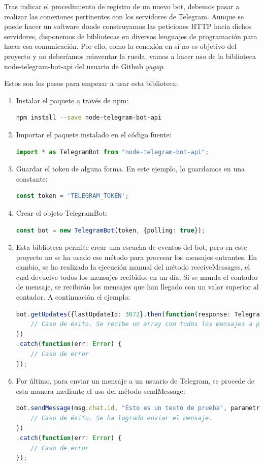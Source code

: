 \documentclass[spanish,12pt, a4paper, twoside]{paper}
\begin{document}
Tras indicar el procedimiento de registro de un nuevo bot, debemos pasar a realizar las conexiones pertinentes con los servidores de Telegram. Aunque se puede hacer un software donde construyamos las peticiones HTTP hacia dichos servidores, disponemos de bibliotecas en diversos lenguajes de programación para hacer esa comunicación. Por ello, como la conexión en sí no es objetivo del proyecto y no deberíamos reinventar la rueda, vamos a hacer uso de la biblioteca node-telegram-bot-api del usuario de Github \emph{yagop}.
\newline

Estos son los pasos para empezar a usar esta biblioteca:
\begin{enumerate}
\item Instalar el paquete a través de npm:
\begin{lstlisting}[language=sh]
npm install --save node-telegram-bot-api
\end{lstlisting}
\item Importar el paquete instalado en el código fuente:
\begin{lstlisting}[language=TypeScript]
import * as TelegramBot from "node-telegram-bot-api";
\end{lstlisting}
\item Guardar el token de alguna forma. En este ejemplo, lo guardamos en una constante:
\begin{lstlisting}[language=TypeScript]
const token = 'TELEGRAM_TOKEN';
\end{lstlisting}
\item Crear el objeto TelegramBot:
\begin{lstlisting}[language=TypeScript]
const bot = new TelegramBot(token, {polling: true});
\end{lstlisting}
\item Esta biblioteca permite crear una escucha de eventos del bot, pero en este proyecto no se ha usado ese método para procesar los mensajes entrantes. En cambio, se ha realizado la ejecución manual del método receiveMessages, el cual devuelve todos los mensajes recibidos en un día. Si se manda el contador de mensaje, se recibirán los mensajes que han llegado con un valor superior al contador. A continuación el ejemplo:
\begin{lstlisting}[language=TypeScript]
bot.getUpdates({lastUpdateId: 3072}.then(function(response: TelegramBot.Update[]) {
	// Caso de éxito. Se recibe un array con todos los mensajes a partir de ese contador y que estén almacenados en el servidor.
})
.catch(function(err: Error) {
	// Caso de error
});
\end{lstlisting}
\item Por último, para enviar un mensaje a un usuario de Telegram, se procede de esta manera mediante el uso del método sendMessage:
\begin{lstlisting}[language=TypeScript]
bot.sendMessage(msg.chat.id, "Esto es un texto de prueba", parametros).then(function(message: TelegramBot.Message) {
	// Caso de éxito. Se ha logrado enviar el mensaje.
})
.catch(function(err: Error) {
	// Caso de error
});
\end{lstlisting}
\end{enumerate}
\end{document}
